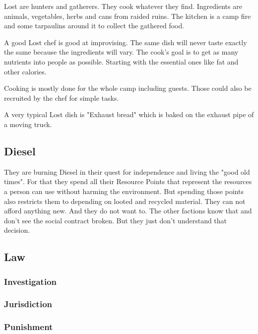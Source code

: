Lost are hunters and gatherers. They cook whatever they find. Ingredients are animals, vegetables, herbs and cans from raided ruins. The kitchen is a camp fire and some tarpaulins around it to collect the gathered food.

A good Lost chef is good at improvising. The same dish will never taste exactly the same because the ingredients will vary. The cook's goal is to get as many nutrients into people as possible. Starting with the essential ones like fat and other calories.

Cooking is mostly done for the whole camp including guests. Those could also be recruited by the chef for simple tasks.

A very typical Lost dish is "Exhaust bread" which is baked on the exhaust pipe of a moving truck.

\subsection{Diesel}

They are burning Diesel in their quest for independence and living the "good old times". For that they spend all their Resource Points that represent the resources a person can use without harming the environment. But spending those points also restricts them to depending on looted and recycled material. They can not afford anything new. And they do not want to.
The other factions know that and don't see the social contract broken. But they just don't understand that decision.

\subsection{Law}
\label{sec: lost law}

\subsubsection{Investigation}


\subsubsection{Jurisdiction}


\subsubsection{Punishment}


